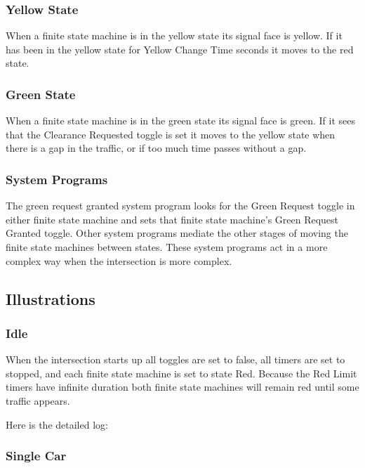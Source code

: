 \documentclass[letterpaper,twoside]{article}
\begin{document}
\subsubsection{Yellow State}
When a finite state machine is in the yellow state its signal face is yellow.
If it has been in the yellow state for Yellow Change Time seconds it moves
to the red state.

\subsubsection{Green State}
When a finite state machine is in the green state its signal face is green.
If it sees that the Clearance Requested toggle is set it moves to the
yellow state when there is a gap in the traffic, or if too much time
passes without a gap.

\subsubsection{System Programs}

The green request granted system program looks for the Green Request
toggle in either finite state machine and sets that finite state machine's
Green Request Granted toggle.
Other system programs mediate the other stages of moving the
finite state machines between states.  These system programs act
in a more complex way when the intersection is more complex.

\subsection{Illustrations}

\subsubsection{Idle}

When the intersection starts up all toggles are set to false,
all timers are set to stopped, and each finite state machine
is set to state Red.
Because the Red Limit timers have infinite duration both finite state machines
will remain red until some traffic appears.

Here is the detailed log:



\subsubsection{Single Car}
\end{document}
